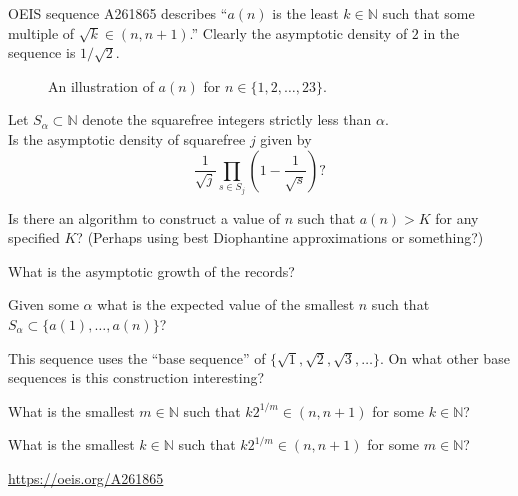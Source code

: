 \documentclass{article}
\begin{document}
  OEIS sequence A261865 describes ``$a(n)$ is the least $k \in \mathbb{N}$ such
  that some multiple of $\sqrt{k} \in (n, n+1)$.'' Clearly the asymptotic
  density of $2$ in the sequence is $1/\sqrt{2}$.
\begin{figure}[!h]
  \centering
  \caption{
    An illustration of $a(n)$ for $n \in \{1,2,\hdots,23\}$.
  }
\end{figure}

\begin{question}
  Let $S_\alpha \subset \mathbb{N}$ denote the squarefree integers strictly
  less than $\alpha$.\\
  Is the asymptotic density of squarefree $j$ given by \[
    \frac{1}{\sqrt{j}}\prod_{s \in S_j}\left(1 - \frac{1}{\sqrt{s}}\right)?
  \]
\end{question}

\begin{related}
  \item Is there an algorithm to construct a value of $n$ such that $a(n) > K$
    for any specified $K$?
    (Perhaps using best Diophantine approximations or something?)
  \item What is the asymptotic growth of the records?
  \item Given some $\alpha$ what is the expected value of the smallest $n$ such
    that $S_\alpha \subset \{a(1), \hdots, a(n)\}$?
  \item This sequence uses the ``base sequence'' of
    $\{\sqrt{1},\sqrt{2},\sqrt{3},\hdots\}$. On what other base sequences is
    this construction interesting?
  \item What is the smallest $m \in \mathbb{N}$ such that
    $k2^{1/m} \in (n, n+1)$ for some $k \in \mathbb{N}$?
    \item What is the smallest $k \in \mathbb{N}$ such that
      $k2^{1/m} \in (n, n+1)$ for some $m \in \mathbb{N}$?
\end{related}
\begin{references}
  \item \url{https://oeis.org/A261865}
\end{references}
\end{document}
